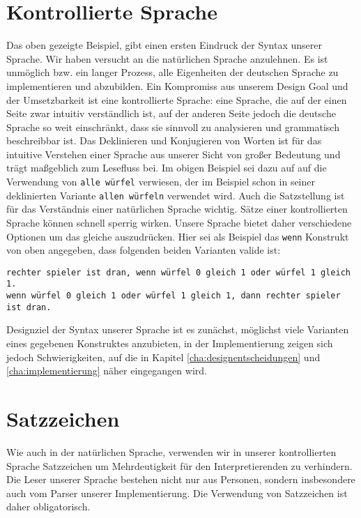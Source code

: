 	\section{Kontrollierte Sprache}
	\label{sec:kontrollierte_sprache}
		Das oben gezeigte Beispiel, gibt einen ersten Eindruck der Syntax unserer Sprache. 
        Wir haben versucht \dg an die natürlichen Sprache anzulehnen. Es ist unmöglich bzw. ein langer Prozess, alle Eigenheiten der deutschen Sprache zu implementieren und abzubilden. Ein Kompromiss aus unserem Design Goal und der Umsetzbarkeit ist eine kontrollierte Sprache: eine Sprache, die auf der einen Seite zwar intuitiv verständlich ist, auf der anderen Seite jedoch die deutsche Sprache so weit einschränkt, dass sie sinnvoll zu analysieren und grammatisch beschreibbar ist. 
        Das Deklinieren und Konjugieren von Worten ist für das intuitive Verstehen einer Sprache aus unserer Sicht von großer Bedeutung und trägt maßgeblich zum Lesefluss bei. Im obigen Beispiel sei dazu auf auf die Verwendung von \texttt{alle würfel} verwiesen, der im Beispiel schon in seiner deklinierten Variante \texttt{allen würfeln} verwendet wird.
        Auch die Satzstellung ist für das Verständnis einer natürlichen Sprache wichtig. Sätze einer kontrollierten Sprache können schnell sperrig wirken. Unsere Sprache bietet daher verschiedene Optionen um das gleiche auszudrücken. Hier sei als Beispiel das \texttt{wenn} Konstrukt von oben angegeben, dass folgenden beiden Varianten valide ist:
\begin{lstlisting}
rechter spieler ist dran, wenn würfel 0 gleich 1 oder würfel 1 gleich 1.
wenn würfel 0 gleich 1 oder würfel 1 gleich 1, dann rechter spieler ist dran.
\end{lstlisting}
        Designziel der Syntax unserer Sprache ist es zunächst, möglichst viele Varianten eines gegebenen Konstruktes anzubieten, in der Implementierung zeigen sich jedoch Schwierigkeiten, auf die in Kapitel \ref{cha:designentscheidungen} und \ref{cha:implementierung} näher eingegangen wird.
        
    \section{Satzzeichen} %
    \label{sec:satzzeichen}
        Wie auch in der natürlichen Sprache, verwenden wir in unserer kontrollierten Sprache Satzzeichen um Mehrdeutigkeit für den Interpretierenden zu verhindern. Die Leser unserer Sprache bestehen nicht nur aus Personen, sondern insbesondere auch vom Parser unserer Implementierung. Die Verwendung von Satzzeichen ist daher obligatorisch.
